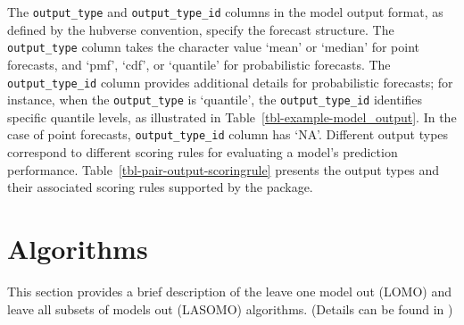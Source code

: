 \documentclass[
  article,
  shortnames,
  notitle]{jss}
\begin{document}
The \texttt{output\_type} and \texttt{output\_type\_id} columns in the
model output format, as defined by the hubverse convention, specify the
forecast structure. The \texttt{output\_type} column takes the character
value `mean' or `median' for point forecasts, and `pmf', `cdf', or
`quantile' for probabilistic forecasts. The \texttt{output\_type\_id}
column provides additional details for probabilistic forecasts; for
instance, when the \texttt{output\_type} is `quantile', the
\texttt{output\_type\_id} identifies specific quantile levels, as
illustrated in Table~\ref{tbl-example-model_output}. In the case of
point forecasts, \texttt{output\_type\_id} column has `NA'. Different
output types correspond to different scoring rules for evaluating a
model's prediction performance. Table~\ref{tbl-pair-output-scoringrule}
presents the output types and their associated scoring rules supported
by the  package.

\begin{table}


\caption{\label{tbl-pair-output-scoringrule}Pairs of output types and
their associated scoring rules for evaluating prediction performance.}

\end{table}%

\section{Algorithms}\label{sec:algorithms}

This section provides a brief description of the leave one model out
(LOMO) and leave all subsets of models out (LASOMO) algorithms. (Details
can be found in \citet{kim2024})
\end{document}
